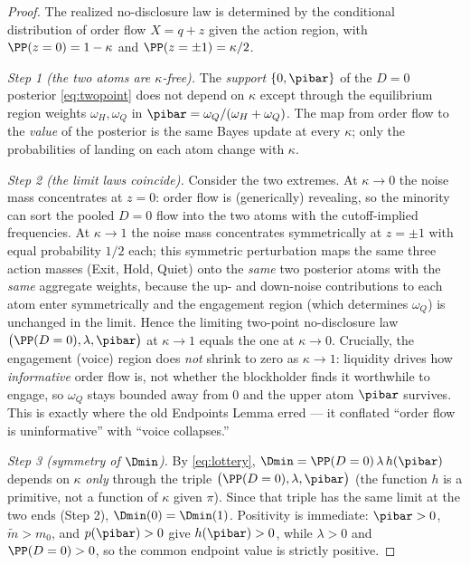 \begin{proof}
The realized no-disclosure law is determined by the conditional
distribution of order flow $X=q+z$ given the action region, with
$\PP(z=0)=1-\kappa$ and $\PP(z=\pm1)=\kappa/2$.

\emph{Step 1 (the two atoms are $\kappa$-free).} The \emph{support}
$\{0,\pibar\}$ of the $D=0$ posterior \eqref{eq:twopoint} does not depend on
$\kappa$ except through the equilibrium region weights $\omega_H,\omega_Q$ in
$\pibar=\omega_Q/(\omega_H+\omega_Q)$. The map from order flow to the
\emph{value} of the posterior is the same Bayes update at every $\kappa$;
only the probabilities of landing on each atom change with $\kappa$.

\emph{Step 2 (the limit laws coincide).} Consider the two extremes.
At $\kappa\to 0$ the noise mass concentrates at $z=0$: order flow is
(generically) revealing, so the minority can sort the pooled $D=0$ flow into
the two atoms with the cutoff-implied frequencies. At $\kappa\to 1$ the noise
mass concentrates symmetrically at $z=\pm1$ with equal probability $1/2$
each; this symmetric perturbation maps the same three action masses (Exit,
Hold, Quiet) onto the \emph{same} two posterior atoms with the \emph{same}
aggregate weights, because the up- and down-noise contributions to each
atom enter symmetrically and the engagement region (which determines
$\omega_Q$) is unchanged in the limit. Hence the limiting two-point
no-disclosure law $\bigl(\PP(D=0),\lambda,\pibar\bigr)$ at $\kappa\to1$
equals the one at $\kappa\to0$. Crucially, the engagement (voice) region
does \emph{not} shrink to zero as $\kappa\to1$: liquidity drives how
\emph{informative} order flow is, not whether the blockholder finds it
worthwhile to engage, so $\omega_Q$ stays bounded away from $0$ and the
upper atom $\pibar$ survives. This is exactly where the old Endpoints Lemma
erred --- it conflated ``order flow is uninformative'' with ``voice
collapses.''

\emph{Step 3 (symmetry of $\Dmin$).} By \eqref{eq:lottery},
$\Dmin=\PP(D=0)\,\lambda\,h(\pibar)$ depends on $\kappa$ \emph{only} through
the triple $\bigl(\PP(D=0),\lambda,\pibar\bigr)$ (the function $h$ is a
primitive, not a function of $\kappa$ given $\pi$). Since that triple has the
same limit at the two ends (Step 2), $\Dmin(0)=\Dmin(1)$. Positivity is
immediate: $\pibar>0$, $\widetilde m>m_0$, and $p(\pibar)>0$ give
$h(\pibar)>0$, while $\lambda>0$ and $\PP(D=0)>0$, so the common endpoint
value is strictly positive.
\end{proof}

